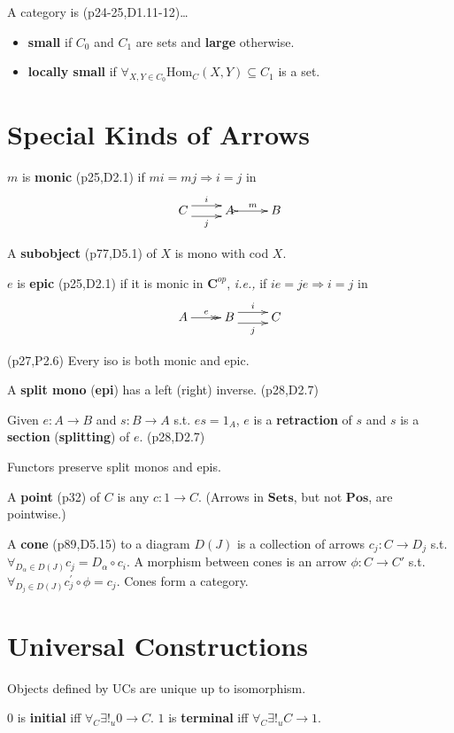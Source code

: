 \documentclass[10pt,twocolumn,letterpaper]{article}
\newcommand{\defn}[1]{{\bf #1}}
\begin{document}
  A category is (p24-25,D1.11-12)\dots
    \begin{itemize}
      \item \defn{small} if $C_0$ and $C_1$ are sets and \defn{large} otherwise.
      \item \defn{locally small} if $\forall_{X,Y \in C_0} \mbox{Hom}_C(X,Y) \subseteq C_1$ is a set.
    \end{itemize}

\section{Special Kinds of Arrows}

  $m$ is \defn{monic} (p25,D2.1) if $mi = mj \Rightarrow i = j$ in
    \[\xymatrix{C \ar@<1ex>[r]^{i} \ar@<-1ex>[r]_j & A \ar@{>->}[r]^m & B} \]

  A \defn{subobject} (p77,D5.1) of $X$ is mono with cod $X$.

  $e$ is \defn{epic} (p25,D2.1) if it is monic in $\mathbf{C}^{op}$,
          {\it i.e.,} if $ie = je \Rightarrow i = j$ in
    \[\xymatrix{A \ar@{->>}[r]^e & B \ar@<1ex>[r]^{i} \ar@<-1ex>[r]_j & C} \]

  (p27,P2.6) Every iso is both monic and epic.

  A \defn{split mono} (\defn{epi}) has a left (right) inverse. (p28,D2.7)

  Given $e : A \to B$ and $s : B \to A$ s.t. $es = 1_A$, $e$ is a \defn{retraction}
    of $s$ and $s$ is a \defn{section} (\defn{splitting}) of $e$. (p28,D2.7)

  Functors preserve split monos and epis.

  A \defn{point} (p32) of $C$ is any $c : 1 \to C$. (Arrows in
  $\mathbf{Sets}$, but not $\mathbf{Pos}$, are pointwise.)

  A \defn{cone} (p89,D5.15) to a diagram $D(J)$ is a collection of arrows
    $c_j : C \to D_j$ s.t. $\forall_{D_\alpha \in D(J)} c_j = D_\alpha \circ
    c_i$.
  A morphism between cones is an arrow $\phi : C \to C'$ s.t.
    $\forall_{D_j \in D(J)} c_j^\prime \circ \phi = c_j$.  Cones form a
    category.

\section{Universal Constructions}

  Objects defined by UCs are unique up to isomorphism.

  $0$ is \defn{initial} iff $\forall_C \exists!_u 0 \to C$.
  $1$ is \defn{terminal} iff $\forall_C \exists!_u C \to 1 $.
\end{document}
